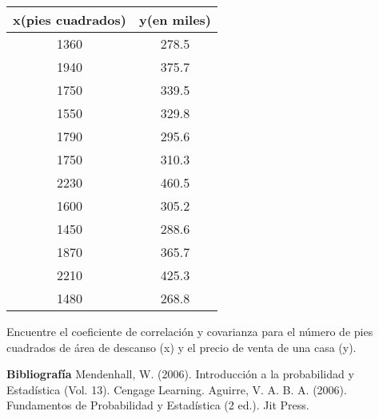 \documentclass{oxmathproblems}
\begin{document}
\begin{questions}
\begin{center}
\begin{tabular}{ |c|c| } 
 \hline
 \textbf{x(pies cuadrados)}  & \textbf{y(en miles)}\\ 
 \hline
 1360 & 278.5 \\
  1940 & 375.7 \\
 1750 & 339.5\\ 
 1550  & 329.8\\ 
 1790 & 295.6\\ 
 1750 & 310.3\\ 
 2230 & 460.5\\ 
 1600 & 305.2\\ 
 1450 & 288.6\\ 
 1870 & 365.7\\ 
 2210 & 425.3\\ 
 1480 & 268.8\\
 \hline
\end{tabular}
\end{center}

Encuentre el coeficiente de correlación y covarianza para el número de pies cuadrados de área de descanso (x) y el precio de venta de una casa (y). 


\end{questions}

\textbf{Bibliografía}
Mendenhall, W. (2006). Introducción a la probabilidad y Estadística (Vol. 13). Cengage Learning.
Aguirre, V. A. B. A. (2006). Fundamentos de Probabilidad y Estadística (2 ed.). Jit Press.
\end{document}

